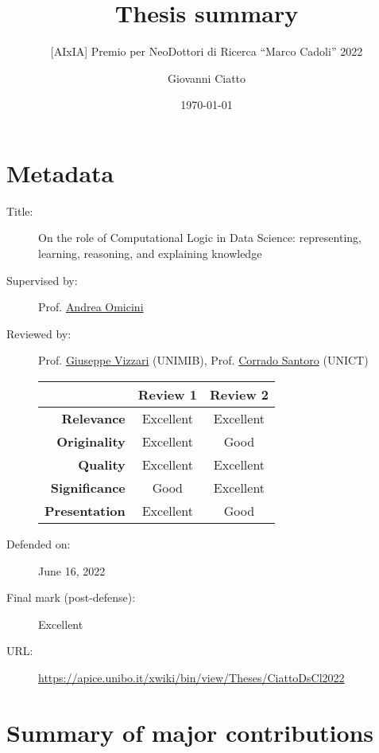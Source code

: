 \documentclass[12pt]{scrartcl}
\title{Thesis summary}
\subtitle{[AIxIA] Premio per NeoDottori di Ricerca ``Marco Cadoli'' 2022}
\author{Giovanni Ciatto}
\date{\today}
\begin{document}
\maketitle

\section*{Metadata}

\begin{description}
    \item[Title:] On the role of Computational Logic in Data Science: representing, learning, reasoning, and explaining knowledge
    \item[Supervised by:] Prof. \href{mailto:andrea.omicini@unibo.it}{Andrea Omicini}
    \item[Reviewed by:] Prof. \href{mailto:giuseppe.vizzari@unimib.it}{Giuseppe Vizzari} (UNIMIB), Prof. \href{mailto:santoro@dmi.unict.it}{Corrado Santoro} (UNICT)
    \begin{center}
        \begin{tabular}{r||c|c}
            & \textbf{Review 1} & \textbf{Review 2}
            \\\hline\hline
            \textbf{Relevance}    & Excellent         & Excellent         \\
            \textbf{Originality}  & Excellent         & Good              \\
            \textbf{Quality}      & Excellent         & Excellent         \\
            \textbf{Significance} & Good              & Excellent         \\
            \textbf{Presentation} & Excellent         & Good
        \end{tabular}
    \end{center}
    \item[Defended on:] June 16, 2022
    \item[Final mark (post-defense):] Excellent
    \item[URL:] \url{https://apice.unibo.it/xwiki/bin/view/Theses/CiattoDsCl2022}
\end{description}

\section*{Summary of major contributions}
\end{document}
